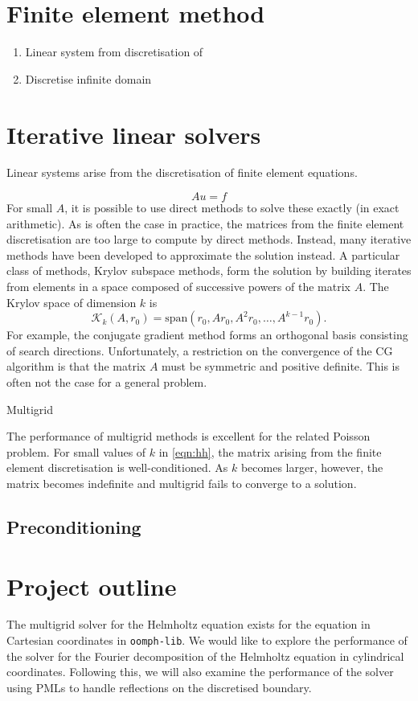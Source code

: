 \section{Finite element method}

\begin{enumerate}
\item Linear system from discretisation of 
\item Discretise infinite domain 
\end{enumerate}


\section{Iterative linear solvers}

Linear systems arise from the discretisation of finite element equations.

\[
	A u = f
\]
For small $A$, it is possible to use direct methods to solve these exactly (in exact arithmetic).
As is often the case in practice, the matrices from the finite element discretisation are too large to compute by direct methods.
Instead, many iterative methods have been developed to approximate the solution instead.
A particular class of methods, Krylov subspace methods, form the solution by building iterates from elements in a space composed of successive powers of the matrix $A$.
The Krylov space of dimension $k$ is 
\[
	\mathcal{K}_k(A, r_0) = \mathrm{span}(r_0, Ar_0, A^2 r_0, \ldots, A^{k-1} r_0).
\]
For example, the conjugate gradient method forms an orthogonal basis consisting of search directions.
Unfortunately, a restriction on the convergence of the CG algorithm is that the matrix $A$ must be symmetric and positive definite.
This is often not the case for a general problem.

Multigrid

The performance of multigrid methods is excellent for the related Poisson problem.
For small values of $k$ in \eqref{eqn:hh}, the matrix arising from the finite element discretisation is well-conditioned.
As $k$ becomes larger, however, the matrix becomes indefinite and multigrid fails to converge to a solution.


\subsection{Preconditioning}








\section{Project outline}

The multigrid solver for the Helmholtz equation exists for the equation in Cartesian coordinates in \texttt{oomph-lib}.
We would like to explore the performance of the solver for the Fourier decomposition of the Helmholtz equation in cylindrical coordinates.
Following this, we will also examine the performance of the solver using PMLs to handle reflections on the discretised boundary.

